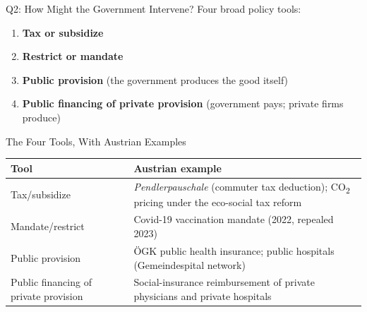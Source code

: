 \documentclass[11pt,aspectratio=169]{beamer}
\begin{document}
\begin{frame}{Q2: How Might the Government Intervene?}
  Four broad policy tools:
  \begin{enumerate}
    \item \textbf{Tax or subsidize}
    \item \textbf{Restrict or mandate}
    \item \textbf{Public provision} (the government produces the good itself)
    \item \textbf{Public financing of private provision} (government pays; private firms produce)
  \end{enumerate}
\end{frame}

\begin{frame}{The Four Tools, With Austrian Examples}
  \begin{center}
  \small
  \begin{tabular}{@{}p{3.4cm}p{8.5cm}@{}}
    \toprule
    \textbf{Tool} & \textbf{Austrian example} \\
    \midrule
    Tax/subsidize & \emph{Pendlerpauschale} (commuter tax deduction); CO\textsubscript{2} pricing under the eco-social tax reform \\[0.4em]
    Mandate/restrict & Covid-19 vaccination mandate (2022, repealed 2023) \\[0.4em]
    Public provision & ÖGK public health insurance; public hospitals (Gemeindespital network) \\[0.4em]
    Public financing of private provision & Social-insurance reimbursement of private physicians and private hospitals \\
    \bottomrule
  \end{tabular}
  \end{center}
\end{frame}
\end{document}
